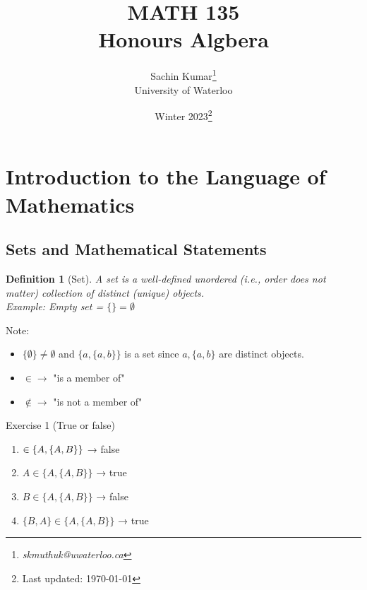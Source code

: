 \documentclass[10pt]{article}
\theoremstyle{break}
\newtheorem{defn}{Definition}[subsection]
\newcommand{\subject}{MATH 135 \\ Honours Algbera}
\newcommand{\semester}{Winter 2023}
\begin{document}
\let\ref\Cref

\title{\subject}
\author{Sachin Kumar\thanks{\itshape skmuthuk@uwaterloo.ca}\\ University of Waterloo}
\date{\semester\thanks{Last updated: \today}}

\maketitle
\newpage
\tableofcontents
\newpage







\section{Introduction to the Language of Mathematics}
\subsection{Sets and Mathematical Statements}
\begin{defn}[Set]
A set is a well-defined unordered (i.e., order does not matter) collection of distinct (unique) objects.\\
Example: 
Empty set = $\{\} = \emptyset$
\end{defn}
Note:
\begin{itemize}
    \item $\{\emptyset\} \ne \emptyset$ and $\{a, \{a, b\}\}$ is a set since $a, \{a, b\}$ are distinct objects.
    \item $\in \to $ "is a member of"
    \item $\notin \to $ "is not a member of"
\end{itemize}
Exercise 1 (True or false)
\begin{enumerate}
    \item $\empty \in \{A, \{A, B\}\}$ → false
    \item $A \in \{A, \{A, B\}\}$ → true
    \item $B \in \{A, \{A, B\}\}$ → false
    \item $\{B, A\} \in \{A , \{A, B\}\}$ → true
\end{enumerate}
\end{document}
